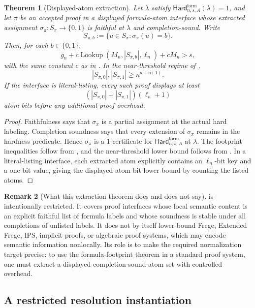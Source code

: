 \documentclass[11pt]{article}
\newtheorem{theorem}{Theorem}[section]
\theoremstyle{definition}
\newtheorem{remark}[theorem]{Remark}
\newcommand{\bits}{\{0,1\}}
\newcommand{\Lookup}{\operatorname{Lookup}}
\newcommand{\HardF}{\mathsf{Hard}^{\mathrm{form}}}
\begin{document}
\begin{theorem}[Displayed-atom extraction]\label{thm:displayed-atom-extraction}
Let \(\lambda\) satisfy \(\HardF_{n,s,A}(\lambda)=1\), and let \(\pi\) be an accepted proof in a displayed formula-atom interface whose extracted assignment \(\sigma_\pi:S_\pi\to\bits\) is faithful at \(\lambda\) and completion-sound.  Write
\[
  S_{\pi,b}:=\{u\in S_\pi:\sigma_\pi(u)=b\}.
\]
Then, for each \(b\in\bits\),
\[
  g_n+c\Lookup(M_n,|S_{\pi,b}|,\ell_n)+cM_n>s,
\]
with the same constant \(c\) as in .  In the near-threshold regime of ,
\[
  |S_{\pi,0}|,|S_{\pi,1}|\ge n^{a-o(1)}.
\]
If the interface is literal-listing, every such proof displays at least
\[
  (|S_{\pi,0}|+|S_{\pi,1}|)(\ell_n+1)
\]
atom bits before any additional proof overhead.
\end{theorem}

\begin{proof}
Faithfulness says that \(\sigma_\pi\) is a partial assignment at the actual hard labeling.  Completion soundness says that every extension of \(\sigma_\pi\) remains in the hardness predicate.  Hence \(\sigma_\pi\) is a \(1\)-certificate for \(\HardF_{n,s,A}\) at \(\lambda\).  The footprint inequalities follow from , and the near-threshold lower bound follows from .  In a literal-listing interface, each extracted atom explicitly contains an \(\ell_n\)-bit key and a one-bit value, giving the displayed atom-bit lower bound by counting the listed atoms.
\end{proof}

\begin{remark}[What this extraction theorem does and does not say]\label{rem:displayed-atom-scope}
 is intentionally restricted.  It covers proof interfaces whose local semantic content is an explicit faithful list of formula labels and whose soundness is stable under all completions of unlisted labels.  It does not by itself lower-bound Frege, Extended Frege, IPS, implicit proofs, or algebraic proof systems, which may encode semantic information nonlocally.  Its role is to make the required normalization target precise: to use the formula-footprint theorem in a standard proof system, one must extract a displayed completion-sound atom set with controlled overhead.
\end{remark}

\subsection{A restricted resolution instantiation}
\end{document}
